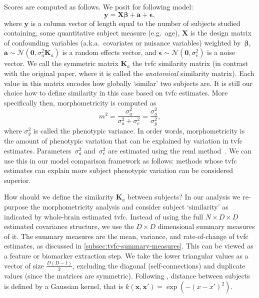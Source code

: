 Scores are computed as follows.
We posit for following model:
\begin{equation}
  \mathbf{y} = \mathbf{X} \mathbf{\beta} + \mathbf{a} + \mathbf{\epsilon},
  \label{eq:lme}
\end{equation}
where $\mathbf{y}$ is a column vector of length equal to the number of subjects studied containing, some quantitative subject measure (e.g.~age), $\mathbf{X}$ is the design matrix of confounding variables (a.k.a.~covariates or nuisance variables) weighted by~$\mathbf{\beta}$, $\mathbf{a}\sim \mathcal{N}(\mathbf{0}, \sigma_a^2 \mathbf{K}_a)$ is a random effects vector, and $\mathbf{\epsilon} \sim \mathcal{N}(\mathbf{0}, \sigma_e^2)$ is a noise vector.
We call the symmetric matrix $\mathbf{K}_a$ the \gls{tvfc} similarity matrix (in contrast with the original paper, where it is called the \emph{anatomical} similarity matrix).
Each value in this matrix encodes how globally `similar' two subjects are.
It is still our choice how to define similarity in this case based on \gls{tvfc} estimates.
More specifically then, morphometricity is computed as
\begin{equation}
  m^2 = \frac{\sigma_a^2}{\sigma_a^2 + \sigma_e^2} = \frac{\sigma_a^2}{\sigma_y^2},
\end{equation}
where $\sigma_y^2$ is called the phenotypic variance.
In order words, morphometricity is the amount of phenotypic variation that can be explained by variation in \gls{tvfc} estimates.
Parameters~$\sigma_a^2$ and~$\sigma_e^2$ are estimated using the \gls{reml} method~\parencite{Patterson1971, Harville1977}.
We can use this in our model comparison framework as follows: methods whose \gls{tvfc} estimates can explain more subject phenotypic variation can be considered superior.

How should we define the similarity $\mathbf{K}_a$ between subjects?
In our analysis we re-purpose the morphometricity analysis and consider subject `similarity' as indicated by whole-brain estimated \gls{tvfc}.
Instead of using the full $N \times D \times D$ estimated covariance structure, we use the $D \times D$ dimensional summary measures of it.
The summary measures are the mean, variance, and rate-of-change of \gls{tvfc} estimates, as discussed in \cref{subsec:tvfc-summary-measures}.
This can be viewed as a feature or biomarker extraction step.
We take the lower triangular values as a vector of size $\frac{D(D-1)}{2}$, excluding the diagonal (self-connections) and duplicate values (since the matrices are symmetric).
Following \textcite{Sabuncu2016}, distance between subjects is defined by a Gaussian kernel, that is $k(\textbf{x}, \textbf{x}') = \exp(-(x-x')^2)$.

